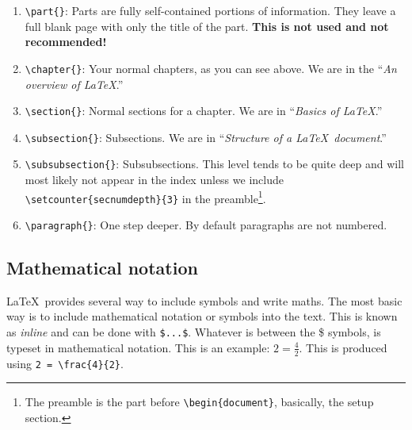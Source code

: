 \begin{enumerate}
	\item \verb|\part{}|: Parts are fully self-contained portions of information. They leave a full blank page with only the title of the part. \textbf{This is not used and not recommended!}
	\item \verb|\chapter{}|: Your normal chapters, as you can see above. We are in the ``\emph{An overview of \LaTeX }.''
	\item \verb|\section{}|: Normal sections for a chapter. We are in ``\emph{Basics of \LaTeX}.''
	\item \verb|\subsection{}|: Subsections. We are in ``\emph{Structure of a \LaTeX\ document}.''
	\item \verb|\subsubsection{}|: Subsubsections. This level tends to be quite deep and will most likely not appear in the index unless we include \verb|\setcounter{secnumdepth}{3}| in the preamble\footnote{The preamble is the part before \texttt{\textbackslash begin\{document\}}, basically, the setup section.}.
	\item \verb|\paragraph{}|: One step deeper. By default paragraphs are not numbered.
\end{enumerate}

\subsection{Mathematical notation}

\LaTeX\ provides several way to include symbols and write maths. The most basic way is to include mathematical notation or symbols into the text. This is known as \emph{inline} and can be done with \verb|$...$|. Whatever is between the \$ symbols, is typeset in mathematical notation. This is an example: $2 = \frac{4}{2}$. This is produced using \verb|2 = \frac{4}{2}|.

